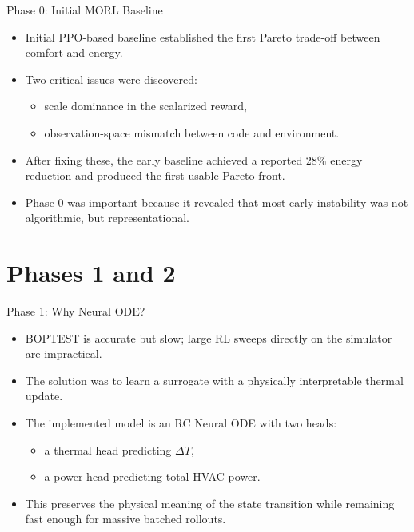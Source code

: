 \documentclass[aspectratio=169,11pt]{beamer}
\begin{document}
\begin{frame}{Phase 0: Initial MORL Baseline}
  \begin{itemize}
    \item Initial PPO-based baseline established the first Pareto trade-off between comfort and energy.
    \item Two critical issues were discovered:
    \begin{itemize}
      \item scale dominance in the scalarized reward,
      \item observation-space mismatch between code and environment.
    \end{itemize}
    \item After fixing these, the early baseline achieved a reported 28\% energy reduction and produced the first usable Pareto front.
    \item Phase 0 was important because it revealed that most early instability was not algorithmic, but representational.
  \end{itemize}
\end{frame}

\section{Phases 1 and 2}

\begin{frame}{Phase 1: Why Neural ODE?}
  \begin{itemize}
    \item BOPTEST is accurate but slow; large RL sweeps directly on the simulator are impractical.
    \item The solution was to learn a surrogate with a physically interpretable thermal update.
    \item The implemented model is an RC Neural ODE with two heads:
    \begin{itemize}
      \item a thermal head predicting $\Delta T$,
      \item a power head predicting total HVAC power.
    \end{itemize}
    \item This preserves the physical meaning of the state transition while remaining fast enough for massive batched rollouts.
  \end{itemize}
\end{frame}
\end{document}
